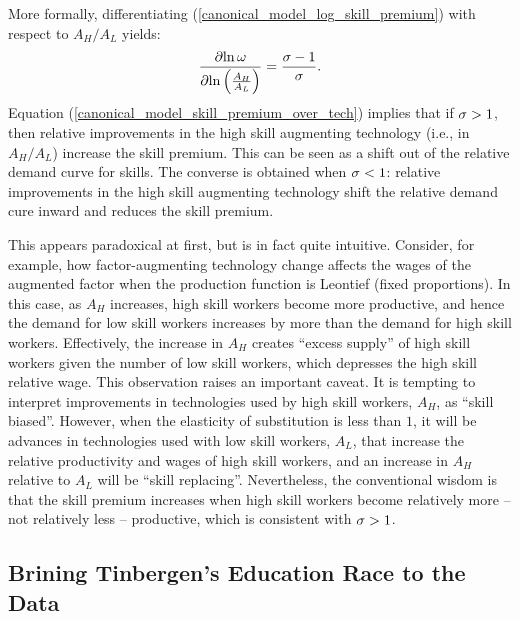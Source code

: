 \documentclass[12pt]{article}
\theoremstyle{definition}
\begin{document}
More formally, differentiating (\ref{canonical_model_log_skill_premium}) with respect to $A_H / A_L$ yields:
\begin{equation}
    \label{canonical_model_skill_premium_over_tech}
    \pdfrac{\ln \o}{\ln \bp{\frac{A_H}{A_L}}} = \frac{\s - 1}{\s}.
\end{equation}
Equation (\ref{canonical_model_skill_premium_over_tech}) implies that if $\sigma > 1$, then relative improvements in the high skill augmenting technology (i.e., in $A_H / A_L$) increase the skill premium. This can be seen as a shift out of the relative demand curve for skills. The converse is obtained when $\sigma < 1$: relative improvements in the high skill augmenting technology shift the relative demand cure inward and reduces the skill premium.

This appears paradoxical at first, but is in fact quite intuitive. Consider, for example, how factor-augmenting technology change affects the wages of the augmented factor when the production function is Leontief (fixed proportions). In this case, as $A_H$ increases, high skill workers become more productive, and hence the demand for low skill workers increases by more than the demand for high skill workers. Effectively, the increase in $A_H$ creates ``excess supply'' of high skill workers given the number of low skill workers, which depresses the high skill relative wage. This observation raises an important caveat. It is tempting to interpret improvements in technologies used by high skill workers, $A_H$, as ``skill biased''. However, when the elasticity of substitution is less than $1$, it will be advances in technologies used with low skill workers, $A_L$, that increase the relative productivity and wages of high skill workers, and an increase in $A_H$ relative to $A_L$ will be ``skill replacing''. Nevertheless, the conventional wisdom is that the skill premium increases when high skill workers become relatively more -- not relatively less -- productive, which is consistent with $\sigma > 1$.

\subsection{Brining Tinbergen's Education Race to the Data}
\end{document}
